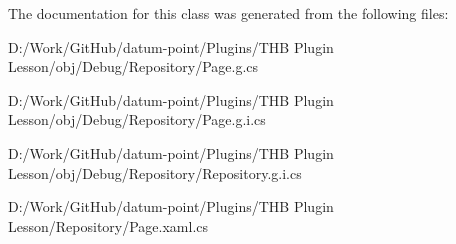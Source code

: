 The documentation for this class was generated from the following files\+:\begin{DoxyCompactItemize}
\item 
D\+:/\+Work/\+Git\+Hub/datum-\/point/\+Plugins/\+T\+H\+B Plugin Lesson/obj/\+Debug/\+Repository/Page.\+g.\+cs\item 
D\+:/\+Work/\+Git\+Hub/datum-\/point/\+Plugins/\+T\+H\+B Plugin Lesson/obj/\+Debug/\+Repository/Page.\+g.\+i.\+cs\item 
D\+:/\+Work/\+Git\+Hub/datum-\/point/\+Plugins/\+T\+H\+B Plugin Lesson/obj/\+Debug/\+Repository/Repository.\+g.\+i.\+cs\item 
D\+:/\+Work/\+Git\+Hub/datum-\/point/\+Plugins/\+T\+H\+B Plugin Lesson/\+Repository/Page.\+xaml.\+cs\end{DoxyCompactItemize}

